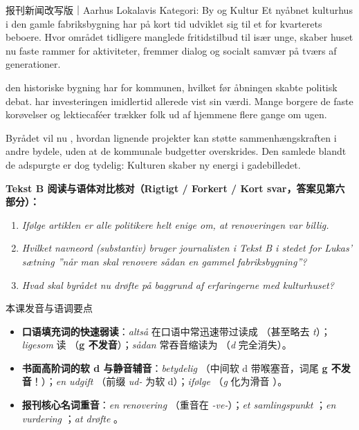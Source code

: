 \begin{emailbox}{报刊新闻改写版｜Aarhus Lokalavis \quad Kategori: By og Kultur}
Et nyåbnet kulturhus i den gamle fabriksbygning har på kort tid udviklet sig til et  for kvarterets beboere. Hvor området tidligere manglede fritidstilbud til især unge, skaber huset nu faste rammer for aktiviteter,  fremmer dialog og socialt samvær på tværs af generationer.

 den historiske bygning har  for kommunen, hvilket før åbningen skabte politisk debat.  har investeringen imidlertid allerede vist sin værdi. Mange borgere  de faste korøvelser og lektiecaféer trækker folk ud af hjemmene flere gange om ugen.

Byrådet vil nu , hvordan lignende projekter kan støtte sammenhængskraften i andre bydele, uden at de kommunale budgetter overskrides. Den samlede  blandt de adspurgte er dog tydelig: Kulturen skaber ny energi i gadebilledet.
\end{emailbox}

\textbf{Tekst B 阅读与语体对比核对（Rigtigt / Forkert / Kort svar，答案见第六部分）：}
\begin{enumerate}
  \item \textit{Ifølge artiklen er alle politikere helt enige om, at renoveringen var billig.} \underline{\hspace{2.2cm}}
  \item \textit{Hvilket navneord (substantiv) bruger journalisten i Tekst B i stedet for Lukas' sætning ”når man skal renovere sådan en gammel fabriksbygning”?} \underline{\hspace{4.8cm}}
  \item \textit{Hvad skal byrådet nu drøfte på baggrund af erfaringerne med kulturhuset?} \\\underline{\hspace{5.2cm}}
\end{enumerate}

\begin{tipbox}{本课发音与语调要点}
\begin{itemize}
  \item \textbf{口语填充词的快速弱读}：\textit{altså} 在口语中常迅速带过读成 （甚至略去 \textit{t}）；\textit{ligesom} 读 （\textbf{g 不发音}）；\textit{sådan} 常吞音缩读为 （\textit{d} 完全消失）。
  \item \textbf{书面高阶词的软 d 与静音辅音}：\textit{betydelig} （中间软 d 带喉塞音，词尾 \textbf{g 不发音}！）；\textit{en udgift} （前缀 \textit{ud-} 为软 d）；\textit{ifølge} （\textit{g} 化为滑音 ）。
  \item \textbf{报刊核心名词重音}：\textit{en renovering} （重音在 \textit{-ve-}）；\textit{et samlingspunkt} ；\textit{en vurdering} ；\textit{at drøfte} 。
\end{itemize}
\end{tipbox}

